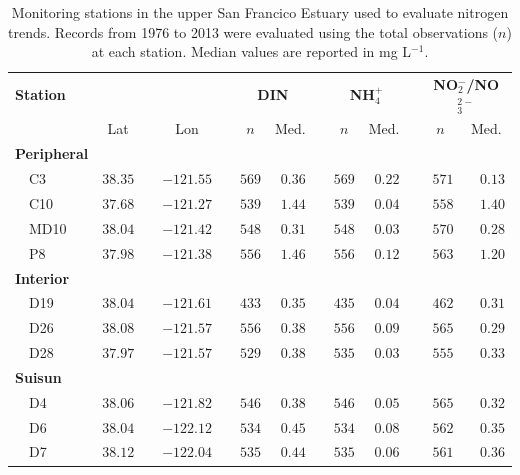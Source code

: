 \documentclass[letterpaper,12pt,oneside]{article}\usepackage[]{graphicx}\usepackage[]{color}
\begin{document}
\begin{table}[!tbp]
\caption{Monitoring stations in the upper San Francico Estuary used to evaluate nitrogen trends. Records from 1976 to 2013 were evaluated using the total observations ($n$) at each station. Median values are reported in mg L$^{-1}$.\label{tab:stdescrp}} 
\begin{center}
\begin{tabular}{lrcrcrrcrrcrr}
\hline\hline
\multicolumn{1}{l}{\bfseries Station}&\multicolumn{1}{c}{\bfseries }&\multicolumn{1}{c}{\bfseries }&\multicolumn{1}{c}{\bfseries }&\multicolumn{1}{c}{\bfseries }&\multicolumn{2}{c}{\bfseries DIN}&\multicolumn{1}{c}{\bfseries }&\multicolumn{2}{c}{\bfseries NH$_{4}^{+}$}&\multicolumn{1}{c}{\bfseries }&\multicolumn{2}{c}{\bfseries NO$_{2}^{-}$/NO$_{3}^{2-}$}\tabularnewline
\cline{6-7} \cline{9-10} \cline{12-13}
\multicolumn{1}{l}{}&\multicolumn{1}{c}{Lat}&\multicolumn{1}{c}{}&\multicolumn{1}{c}{Lon}&\multicolumn{1}{c}{}&\multicolumn{1}{c}{$n$}&\multicolumn{1}{c}{Med.}&\multicolumn{1}{c}{}&\multicolumn{1}{c}{$n$}&\multicolumn{1}{c}{Med.}&\multicolumn{1}{c}{}&\multicolumn{1}{c}{$n$}&\multicolumn{1}{c}{Med.}\tabularnewline
\hline
{\bfseries Peripheral}&&&&&&&&&&&&\tabularnewline
~~C3&$38.35$&&$-121.55$&&$569$&$0.36$&&$569$&$0.22$&&$571$&$0.13$\tabularnewline
~~C10&$37.68$&&$-121.27$&&$539$&$1.44$&&$539$&$0.04$&&$558$&$1.40$\tabularnewline
~~MD10&$38.04$&&$-121.42$&&$548$&$0.31$&&$548$&$0.03$&&$570$&$0.28$\tabularnewline
~~P8&$37.98$&&$-121.38$&&$556$&$1.46$&&$556$&$0.12$&&$563$&$1.20$\tabularnewline
\hline
{\bfseries Interior}&&&&&&&&&&&&\tabularnewline
~~D19&$38.04$&&$-121.61$&&$433$&$0.35$&&$435$&$0.04$&&$462$&$0.31$\tabularnewline
~~D26&$38.08$&&$-121.57$&&$556$&$0.38$&&$556$&$0.09$&&$565$&$0.29$\tabularnewline
~~D28&$37.97$&&$-121.57$&&$529$&$0.38$&&$535$&$0.03$&&$555$&$0.33$\tabularnewline
\hline
{\bfseries Suisun}&&&&&&&&&&&&\tabularnewline
~~D4&$38.06$&&$-121.82$&&$546$&$0.38$&&$546$&$0.05$&&$565$&$0.32$\tabularnewline
~~D6&$38.04$&&$-122.12$&&$534$&$0.45$&&$534$&$0.08$&&$562$&$0.35$\tabularnewline
~~D7&$38.12$&&$-122.04$&&$535$&$0.44$&&$535$&$0.06$&&$561$&$0.36$\tabularnewline
\hline
\end{tabular}\end{center}
\end{table}
\end{document}
